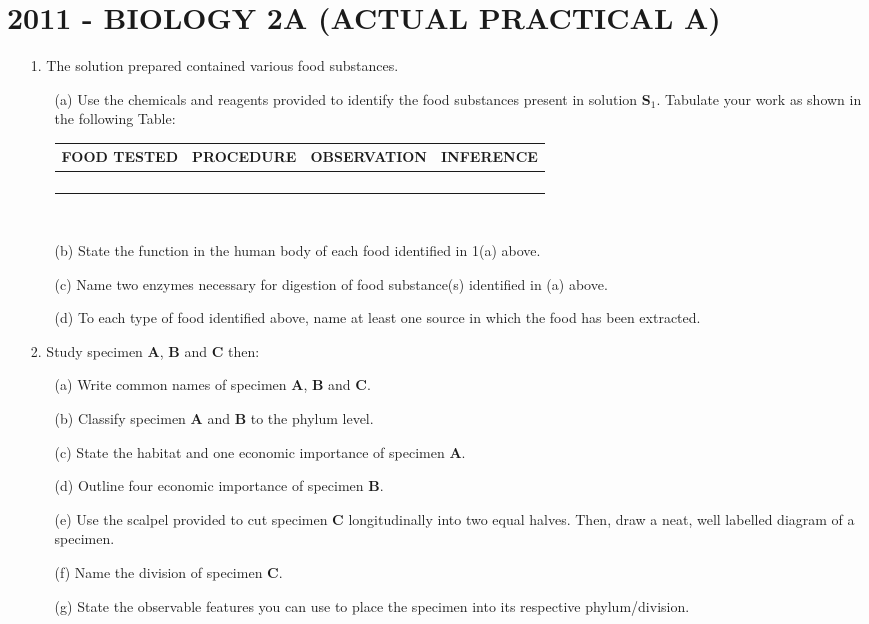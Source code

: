 \section{2011 - BIOLOGY 2A (ACTUAL PRACTICAL A)}

\begin{enumerate}
\item[1.] The solution prepared contained various food substances.
\begin{enumerate}
\item[(a)] Use the chemicals and reagents provided to identify the food substances present in solution \textbf{S$_1$}. Tabulate your work as shown in the following Table:

\begin{center}
\begin{tabular}{|p{3cm}|p{3cm}|p{3cm}|p{3cm}|} \hline
\textbf{FOOD TESTED}&\textbf{PROCEDURE}&\textbf{OBSERVATION}&\textbf{INFERENCE} \\ \hline
&&& \\
&&& \\
&&& \\
&&& \\ \hline
\end{tabular} \\[10pt]
\end{center}
\item[(b)] State the function in the human body of each food identified in 1(a) above.
\item[(c)] Name two enzymes necessary for digestion of food substance(s) identified in (a) above.
\item[(d)] To each type of food identified above, name at least one source in which the food has been extracted.
\end{enumerate}

\item[2.] Study specimen \textbf{A}, \textbf{B} and \textbf{C} then:
\begin{enumerate}
\item[(a)] Write common names of specimen \textbf{A}, \textbf{B} and \textbf{C}.
\item[(b)] Classify specimen \textbf{A} and \textbf{B} to the phylum level.
\item[(c)] State the habitat and one economic importance of specimen \textbf{A}.
\item[(d)] Outline four economic importance of specimen \textbf{B}.
\item[(e)] Use the scalpel provided to cut specimen \textbf{C} longitudinally into two equal halves. Then, draw a neat, well labelled diagram of a specimen.
\item[(f)] Name the division of specimen \textbf{C}.
\item[(g)] State the observable features you can use to place the specimen into its respective phylum/division.
\end{enumerate}

\end{enumerate}